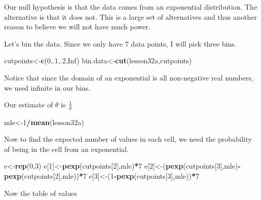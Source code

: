 \documentclass[]{book}
\newenvironment{Shaded}{\begin{snugshade}}{\end{snugshade}}
\newcommand{\KeywordTok}[1]{\textcolor[rgb]{0.13,0.29,0.53}{\textbf{#1}}}
\newcommand{\DecValTok}[1]{\textcolor[rgb]{0.00,0.00,0.81}{#1}}
\newcommand{\OtherTok}[1]{\textcolor[rgb]{0.56,0.35,0.01}{#1}}
\newcommand{\OperatorTok}[1]{\textcolor[rgb]{0.81,0.36,0.00}{\textbf{#1}}}
\newcommand{\NormalTok}[1]{#1}
\theoremstyle{definition}
\theoremstyle{definition}
\theoremstyle{definition}
\theoremstyle{remark}
\begin{document}
Our null hypothesis is that the data comes from an exponential
distribution. The alternative is that it does not. This is a large set
of alternatives and thus another reason to believe we will not have much
power.

Let's bin the data. Since we only have 7 data points, I will pick three
bins.

\begin{Shaded}
\begin{Highlighting}[]
\NormalTok{cutpoints<-}\KeywordTok{c}\NormalTok{(}\DecValTok{0}\NormalTok{,.}\DecValTok{1}\NormalTok{,.}\DecValTok{2}\NormalTok{,}\OtherTok{Inf}\NormalTok{)}
\NormalTok{bin.data<-}\KeywordTok{cut}\NormalTok{(lesson32a,cutpoints)}
\end{Highlighting}
\end{Shaded}

Notice that since the domain of an exponential is all non-negative real
numbers, we used infinite in our bins.

Our estimate of \(\theta\) is \({1 \over \bar{x}}\)

\begin{Shaded}
\begin{Highlighting}[]
\NormalTok{mle<-}\DecValTok{1}\OperatorTok{/}\KeywordTok{mean}\NormalTok{(lesson32a)}
\end{Highlighting}
\end{Shaded}

Now to find the expected number of values in each cell, we need the
probability of being in the cell from an exponential.

\begin{Shaded}
\begin{Highlighting}[]
\NormalTok{e<-}\KeywordTok{rep}\NormalTok{(}\DecValTok{0}\NormalTok{,}\DecValTok{3}\NormalTok{)}
\NormalTok{e[}\DecValTok{1}\NormalTok{]<-}\KeywordTok{pexp}\NormalTok{(cutpoints[}\DecValTok{2}\NormalTok{],mle)}\OperatorTok{*}\DecValTok{7}
\NormalTok{e[}\DecValTok{2}\NormalTok{]<-(}\KeywordTok{pexp}\NormalTok{(cutpoints[}\DecValTok{3}\NormalTok{],mle)}\OperatorTok{-}\KeywordTok{pexp}\NormalTok{(cutpoints[}\DecValTok{2}\NormalTok{],mle))}\OperatorTok{*}\DecValTok{7}
\NormalTok{e[}\DecValTok{3}\NormalTok{]<-(}\DecValTok{1}\OperatorTok{-}\KeywordTok{pexp}\NormalTok{(cutpoints[}\DecValTok{3}\NormalTok{],mle))}\OperatorTok{*}\DecValTok{7}
\end{Highlighting}
\end{Shaded}

Now the table of values
\end{document}
